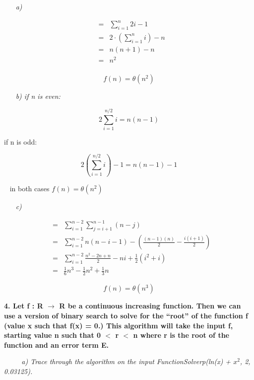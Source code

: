 \documentclass[12pt, letterpaper]{article}
\begin{document}
\-\ \newline
\-\ \it{ a) }

\begin{eqnarray}
    &=& \sum_{i=1}^{n} 2i - 1 \\
    &=& 2 \cdot (\sum_{i=1}^{n} i) - n \\
    &=& n(n + 1) - n \\
    &=& n^{2} \\
\end{eqnarray}

\[ f(n) = \theta(n^{2}) \]

\-\ \newline
\-\ \it{ b) if n is even: }

\[ 2\sum_{i=1}^{n / 2} i = n(n- 1) \]

if n is odd:

\[ 2(\sum_{i=1}^{n / 2} i) - 1 = n(n- 1) - 1 \]

\-\ \newline
in both cases \( f(n) = \theta(n^{2}) \)

\-\ \newline
\-\ \it{ c) }

\begin{eqnarray}
    &=& \sum_{i=1}^{n - 2} \sum_{j = i + 1}^{n - 1} ( n- j) \\
    &=& \sum_{i=1}^{n - 2} n(n - i - 1) - ( \frac{(n - 1)(n)}{2} - \frac{i(i + 1)}{2} ) \\
    &=& \sum_{i=1}^{n - 2} \frac{n^{2} - 2n + n}{2} - ni + \frac{1}{2}(i^{2} + i) \\
    &=& \frac{1}{6} n^{3} - \frac{1}{2}n^{2} + \frac{1}{3}n
\end{eqnarray}

\[ f(n) = \theta(n^3) \]

\newpage
\bf{ 4. Let f : R \(\rightarrow\) R be a continuous increasing function. 
Then we can use a version of binary search to solve for the “root” of the function f (value x such that f(x) = 0.)
 This algorithm will take the input f, starting value n such that 0 \(<\) r \(<\) n where r is the root of the function and an error term E. }

\-\ \newline
\-\ \newline
\-\ \it{ a) Trace through the algorithm on the input FunctionSolverp(ln(x) + \(x^2\), 2, 0.03125).}
\end{document}
